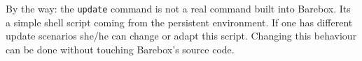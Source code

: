 By the way: the \texttt{update} command is not a real command built into
Barebox. Its a simple shell script coming from the persistent environment.
If one has different update scenarios she/he can change or adapt this script.
Changing this behaviour can be done without touching Barebox's source code.

%
